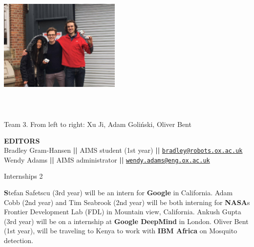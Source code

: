 \documentclass[10pt,final]{papertex}
\begin{document}
\begin{frontpage}
\begin{multicols}{2}
{	\noindent \includegraphics[width=6cm,height=6cm,keepaspectratio]{img/winning}
    \caption{\\\small{Team 3. From left to right: Xu Ji, Adam Goli\'nski, Oliver Bent}} 
	}
\end{multicols}
\begin{mdframed}[leftmargin=7pt,rightmargin=7pt]
	\textbf{EDITORS}\\
	Bradley Gram-Hansen \textbf{||} AIMS student (1st year) \textbf{||} \href{mailto:bradley@robots.ox.ac.uk}{\texttt{bradley@robots.ox.ac.uk}}\\
	Wendy Adams \hspace{1cm}       \textbf{||} AIMS administrator \hspace{0.5cm} \textbf{||} \href{mailto:wendy.adams@eng.ox.ac.uk}{\texttt{wendy.adams@eng.ox.ac.uk}}\\
	
\end{mdframed}


%
%
%
%



\end{frontpage}

\newsection{}

\begin{news}{1}
	{Internships}
	{}
	{}
	{2}


\textbf{S}tefan Safetscu (3rd year) will be an intern for \textbf{Google} in California. Adam Cobb (2nd year) and Tim Seabrook (2nd year) will be both interning for \textbf{NASA}s Frontier Development Lab (FDL) in Mountain view, California. Ankush Gupta (3rd year) will be on a internship at \textbf{Google DeepMind} in London. 
Oliver Bent (1st year), will be traveling to Kenya to work with \textbf{IBM Africa} on Mosquito detection. 
\end{news}
\end{document}
